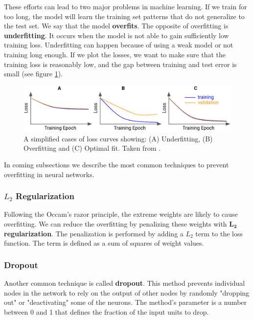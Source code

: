 These efforts can lead to two major problems in machine learning. If we train for too long, the model will learn the training set patterns that do not generalize to the test set. We say that the model \textbf{overfits}. The opposite of overfitting is \textbf{underfitting}. It occurs when the model is not able to gain sufficiently low training loss. Underfitting can happen because of using a weak model or not training long enough. If we plot the losses, we want to make sure that the training loss is reasonably low, and the gap between training and test error is small (see figure \ref{fig:loss_plot}).
 
\begin{figure}[h]
    \centering
    \includegraphics[width=\linewidth]{Sources/Figures/fitting.png}
    \caption{A simplified cases of loss curves \protect\footnotemark showing: (A) Underfitting, (B) Overfitting and (C) Optimal fit. Taken from \cite{bileschi2020deep}.}
    \label{fig:loss_plot}
\end{figure}


In coming subsections we describe the most common techniques to prevent overfitting in neural networks.
\subsubsection{$L_2$ Regularization}
Following the Occam's razor principle\footnotemark , the extreme weights are likely to cause overfitting. We can reduce the overfitting by penalizing these weights with $\boldsymbol{L_2}$ \textbf{regularization}. The penalization is performed by adding a $L_2$ term to the loss function. The term is defined as a sum of squares of weight values. 



\subsubsection{Dropout}
Another common technique is called \textbf{dropout}. This method prevents individual nodes in the network to rely on the output of other nodes by randomly "dropping out" or "deactivating" some of the neurons. The method's parameter is a number between 0 and 1 that defines the fraction of the input units to drop.

